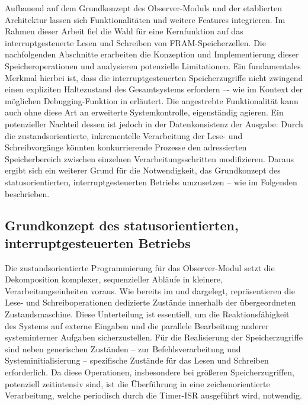 Aufbauend auf dem Grundkonzept des Observer-Moduls und der etablierten Architektur lassen sich Funktionalit\"aten und weitere Features integrieren. Im Rahmen dieser Arbeit fiel die Wahl f\"ur eine Kernfunktion auf das interruptgesteuerte Lesen und Schreiben von FRAM-Speicherzellen. Die nachfolgenden Abschnitte erarbeiten die Konzeption und Implementierung dieser Speicheroperationen und analysieren potenzielle Limitationen. Ein fundamentales Merkmal hierbei ist, dass die interruptgesteuerten Speicherzugriffe nicht zwingend einen expliziten Haltezustand des Gesamtsystems erfordern –- wie im Kontext der m\"oglichen Debugging-Funktion in  erl\"autert. Die angestrebte Funktionalit\"at kann auch ohne diese Art an erweiterte Systemkontrolle, eigenst\"andig agieren. Ein potenzieller Nachteil dessen ist jedoch in der Datenkonsistenz der Ausgabe: Durch die zustandsorientierte, inkrementelle Verarbeitung der Lese- und Schreibvorg\"ange k\"onnten konkurrierende Prozesse den adressierten Speicherbereich zwischen einzelnen Verarbeitungsschritten modifizieren. Daraus ergibt sich ein weiterer Grund f\"ur die Notwendigkeit, das Grundkonzept des statusorientierten, interruptgesteuerten Betriebs umzusetzen – wie im Folgenden beschrieben.


\subsection{Grundkonzept des statusorientierten, interruptgesteuerten Betriebs}
\label{sec:konzept_status_&_interrupt}

Die zustandsorientierte Programmierung f\"ur das Observer-Modul setzt die Dekomposition komplexer, sequenzieller Abl\"aufe in kleinere, Verarbeitungseinheiten voraus. Wie bereits im  und  dargelegt, repr\"asentieren die Lese- und Schreiboperationen dedizierte Zust\"ande innerhalb der \"ubergeordneten Zustandsmaschine. Diese Unterteilung ist essentiell, um die Reaktionsf\"ahigkeit des Systems auf externe Eingaben und die parallele Bearbeitung anderer systeminterner Aufgaben sicherzustellen. F\"ur die Realisierung der Speicherzugriffe sind neben generischen Zust\"anden -- zur Befehlsverarbeitung und Systeminitialisierung -- spezifische Zust\"ande f\"ur das Lesen und Schreiben erforderlich. Da diese Operationen, insbesondere bei gr\"o{\ss}eren Speicherzugriffen, potenziell zeitintensiv sind, ist die \"Uberf\"uhrung in eine zeichenorientierte Verarbeitung, welche periodisch durch die Timer-ISR ausgef\"uhrt wird, notwendig.

